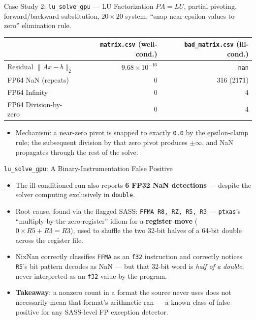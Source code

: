 \documentclass[aspectratio=169,11pt]{beamer}
\begin{document}
\begin{frame}{Case Study 2: \texttt{lu\_solve\_gpu} --- LU Factorization}
$PA = LU$, partial pivoting, forward/backward substitution, $20\times20$
system, ``snap near-epsilon values to zero'' elimination rule.
\begin{center}
\begin{tabular}{lrr}
\toprule
 & \texttt{matrix.csv} (well-cond.) & \texttt{bad\_matrix.csv} (ill-cond.) \\
\midrule
Residual $\lVert Ax-b\rVert_2$ & $9.68\times10^{-16}$ & \texttt{nan} \\
FP64 NaN (repeats) & 0 & 316 (2171) \\
FP64 Infinity & 0 & 4 \\
FP64 Division-by-zero & 0 & 4 \\
\bottomrule
\end{tabular}
\end{center}
\begin{itemize}
  \item Mechanism: a near-zero pivot is snapped to exactly \texttt{0.0} by
    the epsilon-clamp rule; the subsequent division by that zero pivot
    produces $\pm\infty$, and NaN propagates through the rest of the solve.
\end{itemize}
\end{frame}

\begin{frame}{\texttt{lu\_solve\_gpu}: A Binary-Instrumentation False Positive}
\begin{itemize}
  \item The ill-conditioned run also reports \textbf{6 FP32 NaN detections}
    --- despite the solver computing exclusively in \texttt{double}.
  \item Root cause, found via the flagged SASS: \texttt{FFMA R8, RZ, R5, R3}
    --- \texttt{ptxas}'s ``multiply-by-the-zero-register'' idiom for a
    \textbf{register move} ($0{\times}R5+R3=R3$), used to shuffle the two
    32-bit halves of a 64-bit double across the register file.
  \item NixNan correctly classifies \texttt{FFMA} as an \texttt{f32}
    instruction and correctly notices \texttt{R5}'s bit pattern decodes as
    NaN --- but that 32-bit word is \emph{half of a double}, never
    interpreted as an \texttt{f32} value by the program.
  \item \textbf{Takeaway}: a nonzero count in a format the source never uses
    does not necessarily mean that format's arithmetic ran --- a known class
    of false positive for any SASS-level FP exception detector.
\end{itemize}
\end{frame}
\end{document}

